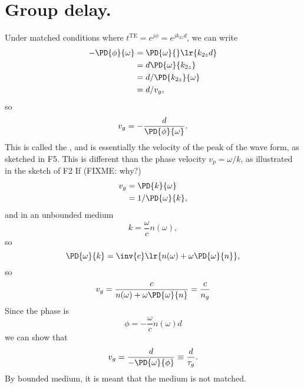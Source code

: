 \section{Group delay.}
%
Under matched conditions where \( t^{\textrm{TE}} = e^{j \phi} = e^{j k_{2z} d} \), we can write
%
\begin{equation}\label{eqn:emtLecture10:520}
\begin{aligned}
- \PD{\phi}{\omega}
&= \PD{\omega}{} \lr{ k_{2z} d }
\\ &= d \PD{\omega}{k_{2z}}
\\ &= d /\PD{k_{2z}}{\omega}
\\ &= d / v_g,
\end{aligned}
\end{equation}
%
so
%
\begin{equation}\label{eqn:emtLecture10:540}
v_g = -\frac{d}{\PD{\phi}{\omega}}.
\end{equation}
%
This is called the , and is essentially the velocity of the peak of the wave form, as sketched in
%
F5.
%
This is different than the phase velocity \( v_p = \omega/k \), as illustrated in the sketch of
%
F2
%
If (FIXME: why?)
%
\begin{equation}\label{eqn:emtLecture10:660}
\begin{aligned}
v_g
&= \PD{k}{\omega}
\\ &= 1/\PD{\omega}{k},
\end{aligned}
\end{equation}
%
and in an unbounded medium
\begin{equation}\label{eqn:emtLecture10:560}
k = \frac{\omega}{c} n(\omega),
\end{equation}
%
so
\begin{equation}\label{eqn:emtLecture10:580}
\PD{\omega}{k}
=
\inv{c} \lr{ n(\omega) + \omega \PD{\omega}{n} },
\end{equation}
%
so
\begin{equation}\label{eqn:emtLecture10:600}
v_g
= \frac{c}{n(\omega) + \omega \PD{\omega}{n} }
= \frac{c}{n_g}
\end{equation}
%
Since the phase is
%
\begin{equation}\label{eqn:emtLecture10:680}
\phi = -\frac{\omega}{c} n(\omega) d
\end{equation}
%
we can show that
\begin{equation}\label{eqn:emtLecture10:700}
v_g
= \frac{d}{-\PD{\omega}{\phi}}
\equiv
\frac{d}{\tau_g}.
\end{equation}
%
By bounded medium, it is meant that the medium is not matched.
%
